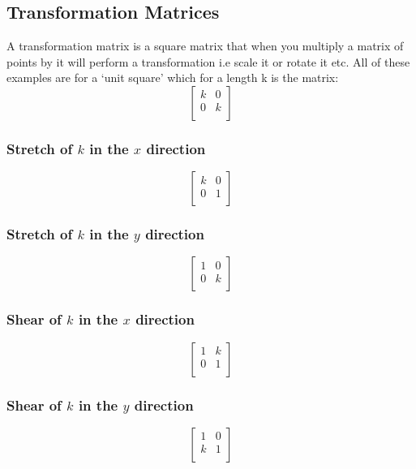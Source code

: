 \documentclass[12pt] {article}
\begin{document}
\subsection*{Transformation Matrices }
A transformation matrix is a square matrix that when you multiply a matrix of points by it 
will perform a transformation i.e scale it or rotate it etc. All of these examples are for 
a `unit square' which for a length k is the matrix:
\begin{equation*}
  \begin{bmatrix}
    k & 0 \\
    0 & k \\
  \end{bmatrix}
\end{equation*}

\subsubsection*{Stretch of $k$ in the $x$ direction}
\begin{equation*}
  \begin{bmatrix}
    k & 0 \\
    0 & 1 \\
  \end{bmatrix}
\end{equation*}

\subsubsection*{Stretch of $k$ in the $y$ direction}
\begin{equation*}
  \begin{bmatrix}
    1 & 0 \\
    0 & k \\
  \end{bmatrix}
\end{equation*}
\subsubsection*{Shear of $k$ in the $x$ direction }
\begin{equation*}
  \begin{bmatrix}
    1 & k \\
    0 & 1 \\
  \end{bmatrix}
\end{equation*}

\subsubsection*{Shear of $k$ in the $y$ direction }
\begin{equation*}
  \begin{bmatrix}
    1 & 0 \\
    k & 1 \\
  \end{bmatrix}
\end{equation*}
\end{document}
